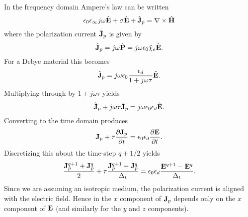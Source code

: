 In the frequency domain Ampere's law can be written
\begin{equation}
 \epsilon_0\epsilon_\infty j\omega\hat{\mathbf{E}}+\sigma\hat{\mathbf{E}}+\hat{\mathbf{J}}_p =
	\nabla\times\hat{\mathbf{H}}
\end{equation}
where the polarization current $\hat{\mathbf{J}}_p$ is given by
\begin{equation}
  \hat{\mathbf{J}}_p = j\omega\hat{\mathbf{P}} = j\omega\epsilon_0\hat{\chi}_e\hat{\mathbf{E}}.
\end{equation}
For a Debye material this becomes
\begin{equation}
  \hat{\mathbf{J}}_p = j\omega\epsilon_0
	\frac{\epsilon_d}{1+j\omega\tau}\hat{\mathbf{E}}.
\end{equation}
Multiplying through by $1+j\omega\tau$ yields
\begin{equation}
  \hat{\mathbf{J}}_p + j\omega\tau\hat{\mathbf{J}}_p = j\omega\epsilon_0\epsilon_d\hat{\mathbf{E}}.
\end{equation}
Converting to the time domain produces
\begin{equation}
  \mathbf{J}_p + \tau\frac{\partial\mathbf{J}_p}{\partial t} 
   = \epsilon_0\epsilon_d\frac{\partial\mathbf{E}}{\partial t}.
\end{equation}
Discretizing this about the time-step $q+1/2$ yields
\begin{equation}
  \frac{\mathbf{J}_p^{q+1} + \mathbf{J}_p^q}{2} + 
  \tau\frac{\mathbf{J}_p^{q+1} - \mathbf{J}_p^q}{\Delta_t} =
  \epsilon_0\epsilon_d\frac{\mathbf{E}^{q+1}-\mathbf{E}^q}{\Delta_t}.
  \label{eq:vectorDiscreteJp}
\end{equation}
Since we are assuming an isotropic medium, the polarization current is
aligned with the electric field.  Hence in 
the $x$ component of $\mathbf{J}_p$ depends only on the $x$ component of
$\mathbf{E}$ (and similarly for the $y$ and $z$ components).


